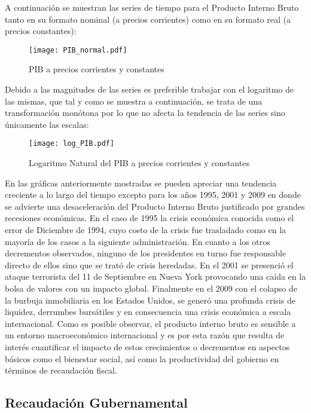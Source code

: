 A continuación se muestran las series de tiempo para el Producto Interno Bruto tanto en su formato nominal (a precios corrientes) como en su formato real (a precios constantes):


\begin{figure}[H]
\centering
\texttt{[image: PIB\_normal.pdf]}
\caption{PIB a precios corrientes y constantes}
\label{PIB_normal}
\end{figure}


Debido a las magnitudes de las series es preferible trabajar con el logaritmo de las mismas, que tal y como se muestra a continuación, se trata de una transformación monótona por lo que no afecta la tendencia de las series sino únicamente las escalas:


\begin{figure}[H]
\centering
\texttt{[image: log\_PIB.pdf]}
\caption{Logaritmo Natural del PIB a precios corrientes y constantes}
\label{log_PIB}
\end{figure}

En las gráficas anteriormente mostradas se pueden apreciar una tendencia creciente a lo largo del tiempo excepto para los años 1995, 2001 y 2009 en donde se advierte una desaceleración del Producto Interno Bruto justificado por grandes recesiones económicas. En el caso de 1995 la crisis económica conocida como el error de Diciembre de 1994, cuyo costo de la crisis fue trasladado como en la mayoría de los casos a la siguiente administración. En cuanto a los otros decrementos observados, ninguno de los presidentes en turno fue responsable directo de ellos sino que se trató de crisis heredadas. En el 2001 se presenció el ataque terrorista del 11 de Septiembre en Nueva York  provocando una caída en la bolsa de valores con un impacto global. Finalmente en el  2009 con el colapso de la burbuja inmobiliaria en los Estados Unidos, se generó una profunda crisis de liquidez, derrumbes bursátiles y en consecuencia una crisis económica a escala internacional. Como es posible observar, el producto interno bruto es sensible a un entorno macroeconómico internacional y es por esta razón que resulta de interés cuantificar el impacto de estos crecimientos o decrementos en aspectos básicos como el bienestar social, así como la productividad del gobierno en términos de recaudación fiscal.





\subsection{Recaudación Gubernamental}


